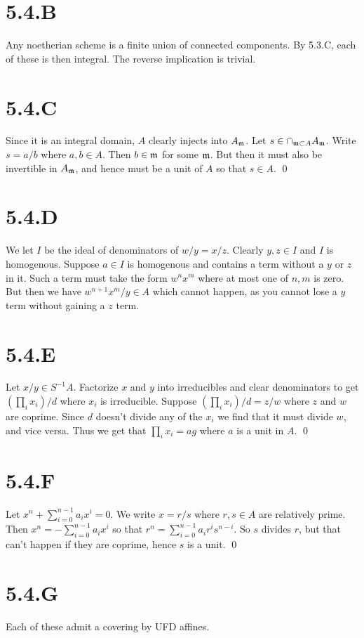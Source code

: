 \documentclass{article}
\begin{document}
\section{5.4.B}
Any noetherian scheme is a finite union of connected components. By 5.3.C, each
of these is then integral. The reverse implication is trivial.

\section{5.4.C}
Since it is an integral domain, $A$ clearly injects into
$A_{\mathfrak{m}}$. Let $s \in \cap_{\mathfrak{m} \subset A} A_{\mathfrak{m}}$. Write
$s=a/b$ where $a, b \in A$. Then
$b \in \mathfrak{m}$ for some $\mathfrak{m}$. But then it must also
be invertible in $A_{\mathfrak{m}}$, and hence must be a unit of
$A$ so that $s \in A$. \qed

\section{5.4.D}
We let $I$ be the ideal of denominators of
$w/y=x/z$. Clearly $y, z \in I$ and
$I$ is homogenous. Suppose $a \in I$ is
homogenous and contains a term without a $y$ or
$z$ in it. Such a term must take the form
$w^nx^m$ where at most one of $n,m$ is zero.
But then we have $w^{n+1}x^m/y \in A$ which cannot happen, as you cannot
lose a $y$ term without gaining a $z$
term.

\section{5.4.E}
Let $x/y \in S^{-1}A$. Factorize $x$ and
$y$ into irreducibles and clear denominators to get
$(\prod_i x_i)/d$ where $x_i$ is irreducible. Suppose
$(\prod_i x_i)/d=z/w$ where $z$ and
$w$ are coprime. Since $d$ doesn't
divide any of the $x_i$ we find that it must divide
$w$, and vice versa. Thus we get that
$\prod_i x_i=ag$ where $a$ is a unit in
$A$. \qed

\section{5.4.F}
Let $x^n+\sum_{i=0}^{n-1} a_ix^i=0$. We write $x=r/s$ where
$r, s \in A$ are relatively prime. Then $x^n=-\sum_{i=0}^{n-1} a_ix^{i}$ so
that $r^n=\sum_{i=0}^{n-1} a_ir^is^{n-i}$. So $s$ divides
$r$, but that can't happen if they are coprime, hence
$s$ is a unit. \qed

\section{5.4.G}
Each of these admit a covering by UFD affines.
\end{document}

